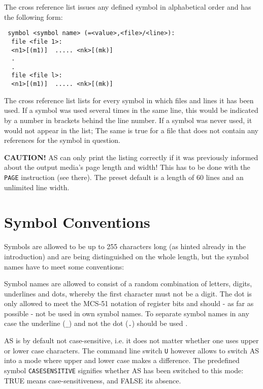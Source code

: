 \documentclass[12pt,twoside]{report}
\newcommand{\bb}[1]{{\bf #1}}
\newcommand{\tty}[1]{{\tt #1}}
\begin{document}
The cross reference list issues any defined symbol in alphabetical
order and has the following form:
\begin{verbatim}
 symbol <symbol name> (=<value>,<file>/<line>):
  file <file 1>:
  <n1>[(m1)]  ..... <nk>[(mk)]
  .
  .
  file <file l>:
  <n1>[(m1)]  ..... <nk>[(mk)]
\end{verbatim}
The cross reference list lists for every symbol in which files and lines
it has been used.  If a symbol was used several times in the same line,
this would be indicated by a number in brackets behind the line number.
If a symbol was never used, it would not appear in the list; The same is
true for a file that does not contain any references for the symbol in
question.

\bb{CAUTION!}  AS can only print the listing correctly if it was
previously informed about the output media's page length and width!
This has to be done with the \tty{PAGE} instruction (see there).  The
preset default is a length of 60 lines and an unlimited line width.


\section{Symbol Conventions}
\label{SectSymConv}

Symbols are allowed to be up to 255 characters long (as hinted already
in the introduction) and are being distinguished on the whole
length, but the symbol names have to meet some conventions:

Symbol names are allowed to consist of a random combination of
letters, digits, underlines and dots, whereby the first character must
not be a digit. The dot is only allowed to meet the MCS-51 notation of
register bits and should - as far as possible - not be used in own symbol
names.  To separate symbol names in any case the underline (\tty{\_}) and not
the dot (\tty{.}) should be used .

AS is by default not case-sensitive, i.e. it does not matter whether
one uses upper or lower case characters.  The command line switch \tty{U}
however allows to switch AS into a mode where upper and lower case
makes a difference.  The predefined symbol \tty{CASESENSITIVE} signifies
whether AS has been switched to this mode: TRUE means case-sensitiveness,
and FALSE its absence.
\end{document}
